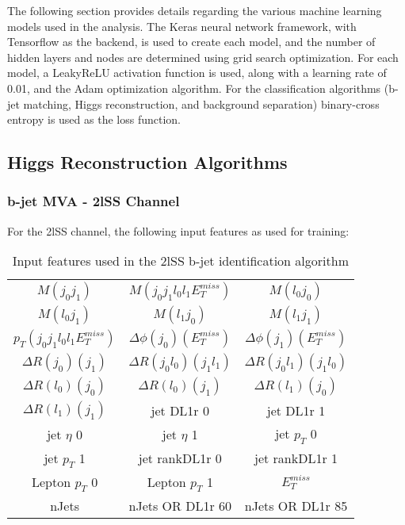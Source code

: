 
The following section provides details regarding the various machine learning models used in the analysis. The Keras neural network framework, with Tensorflow as the backend, is used to create each model, and the number of hidden layers and nodes are determined using grid search optimization. For each model, a LeakyReLU activation function is used, along with a learning rate of 0.01, and the Adam optimization algorithm. For the classification algorithms (b-jet matching, Higgs reconstruction, and background separation) binary-cross entropy is used as the loss function. 

\subsection{Higgs Reconstruction Algorithms}
\label{subsec:higgsRecoMVA}

\subsubsection{b-jet MVA - 2lSS Channel}
\label{subsec:top2lSS}
                                                                                                                     
For the 2lSS channel, the following input features as used for training:

\begin{table}[h!]
  \begin{center}
  \begin{tabular}{ccc}
    $M(j_0j_1)$ & $M(j_0j_1l_0l_1E_T^{miss})$ & $M(l_0j_0)$ \\
    $M(l_0j_1)$ & $M(l_1j_0)$ & $M(l_1j_1)$ \\
    $p_T(j_0j_1l_0l_1E_T^{miss})$ & $\Delta\phi(j_0)(E_T^{miss})$ & $\Delta\phi(j_1)(E_T^{miss})$ \\
    $\Delta R(j_0)(j_1)$ & $\Delta R(j_0l_0)(j_1l_1)$ & $\Delta R(j_0l_1)(j_1l_0)$ \\
    $\Delta R(l_0)(j_0)$ & $\Delta R(l_0)(j_1)$ & $\Delta R(l_1)(j_0)$ \\
    $\Delta R(l_1)(j_1)$ & jet DL1r 0 & jet DL1r 1 \\
    jet  $\eta$ 0 & jet  $\eta$ 1 & jet  $p_T$ 0 \\
    jet  $p_T$ 1 & jet rankDL1r 0 & jet rankDL1r 1 \\
    Lepton  $p_T$ 0 & Lepton  $p_T$ 1 & $E_T^{miss}$ \\
    nJets & nJets OR DL1r 60 & nJets OR DL1r 85\\
  \end{tabular}
  \end{center}
  \caption{Input features used in the 2lSS b-jet identification algorithm}
  \label{tab:top2lSSfeatures}   
\end{table}

